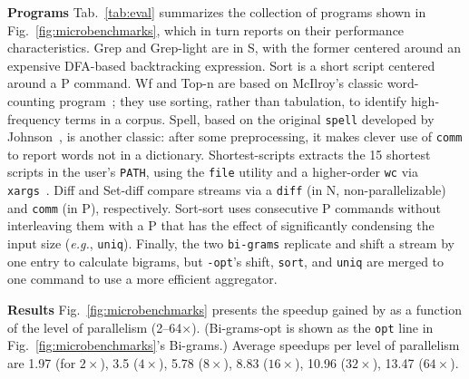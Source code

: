 \documentclass[letterpaper,twocolumn,10pt]{article}
\newcommand{\eg}{{\em e.g.}, }
\newcommand{\heading}[1]{\vspace{4pt}\noindent\textbf{#1}\enspace}
\newcommand{\ttt}[1]{\texttt{#1}}
\newcommand{\cn}[1]{\mbox{\textcircled{\footnotesize #1}}}
\newcommand{\sta}{\cn{\textsc{S}}\xspace}
\newcommand{\pur}{\cn{\textsc{P}}\xspace}
\newcommand{\npu}{\cn{\textsc{N}}\xspace}
\newcommand{\nv}[1]{[{\color{cyan}nv: #1}]}
\newcommand{\kk}[1]{[{\color{magenta}kk: #1}]}
\newcommand{\tr}[1]{} %
\begin{document}
\heading{Programs}
Tab.~\ref{tab:eval} summarizes the collection of programs shown in Fig.~\ref{fig:microbenchmarks}, which in turn reports on their performance characteristics.
Grep and Grep-light are in \sta, with the former centered around an expensive DFA-based backtracking expression.
Sort is a short script centered around a \pur command.
Wf and Top-n are based on McIlroy's classic word-counting program~\cite{bentley1986literate};
  they use sorting, rather than tabulation, to identify high-frequency terms in a corpus.
Spell, based on the original \ttt{spell} developed by Johnson~\cite{bentley1985spelling}, is another \unix classic:
  after some preprocessing, it makes clever use of \ttt{comm} to report words not in a dictionary.
Shortest-scripts extracts the 15 shortest scripts in the user's \ttt{PATH}, using the \ttt{file} utility and a higher-order \ttt{wc} via \ttt{xargs}~\cite[pg. 7]{taylor2004wicked}.
Diff and Set-diff compare streams via a \ttt{diff} (in \npu, non-parallelizable) and \ttt{comm} (in \pur), respectively.
Sort-sort uses consecutive \pur commands without interleaving them with a \pur that has the effect of significantly condensing the input size (\eg \ttt{uniq}).
Finally, the two \ttt{bi-grams} replicate and shift a stream by one entry to calculate bigrams, but \ttt{-opt}'s shift, \ttt{sort}, and \ttt{uniq} are merged to one command to use a more efficient aggregator.

\heading{Results}
Fig.~\ref{fig:microbenchmarks} presents the speedup gained by \sys as a function of the level of parallelism (2--64$\times$).
(Bi-grams-opt is shown as the \ttt{opt} line in Fig.~\ref{fig:microbenchmarks}'s Bi-grams.)
Average speedups per level of parallelism are 1.97 (for $2\times$), 3.5 ($4\times$), 5.78 ($8\times$), 8.83 ($16\times$), 10.96 ($32\times$), 13.47 ($64\times$).
\end{document}
